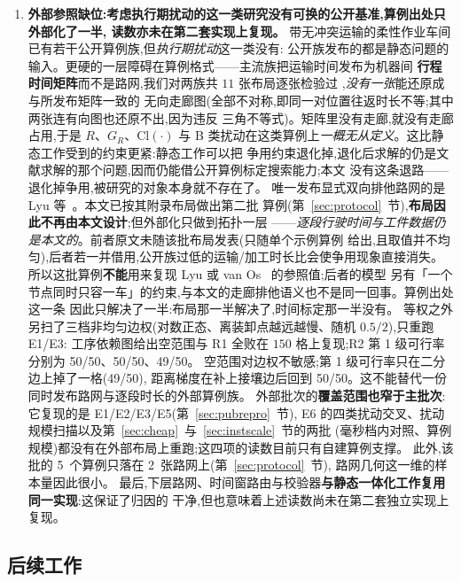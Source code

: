 \documentclass[manuscript,screen,review]{acmart}
\newcommand{\NPairs}{50}
\newcommand{\NPubInst}{5}
\newcommand{\NPubNets}{2}
\newcommand{\WeightLogRtwo}{\NPairs/\NPairs}
\newcommand{\WeightLuRtwo}{\NPairs/\NPairs}
\newcommand{\WeightSplitRtwo}{49/\NPairs}
\begin{document}
\begin{enumerate}[leftmargin=1.6em,itemsep=0.35em]
\item \textbf{外部参照缺位:考虑执行期扰动的这一类研究没有可换的公开基准,算例出处只外部化了一半,
读数亦未在第二套实现上复现。}
带无冲突运输的柔性作业车间已有若干公开算例族,但\emph{执行期扰动}这一类没有:
公开族发布的都是静态问题的输入。更硬的一层障碍在算例格式——主流族把运输时间发布为机器间
\textbf{行程时间矩阵}而不是路网,我们对两族共 \(11\) 张布局逐张检验过
\cite{homayouni2021production,bilge1995time},\emph{没有一张}能还原成与所发布矩阵一致的
无向走廊图(全部不对称,即同一对位置往返时长不等;其中两张连有向图也还原不出,因为违反
三角不等式)。矩阵里没有走廊,就没有走廊占用,于是 \(R\)、\(G_R\)、\(\mathrm{Cl}(\cdot)\)
与 B 类扰动在这类算例上\emph{一概无从定义}。这比静态工作受到的约束更紧:静态工作可以把
争用约束退化掉,退化后求解的仍是文献求解的那个问题,因而仍能借公开算例标定搜索能力;本文
没有这条退路——退化掉争用,被研究的对象本身就不存在了。
唯一发布显式双向排他路网的是 Lyu 等~\cite{lyu2019approach}。本文已按其附录布局做出第二批
算例(第~\ref{sec:protocol}~节),\textbf{布局因此不再由本文设计};但外部化只做到拓扑一层
——\emph{逐段行驶时间与工件数据仍是本文的}。前者原文未随该批布局发表(只随单个示例算例
给出,且取值并不均匀),后者若一并借用,公开族过低的运输/加工时长比会使争用现象直接消失。
所以这批算例\textbf{不能}用来复现 Lyu 或 van Os~\cite{vanos2026exact} 的参照值;后者的模型
另有「一个节点同时只容一车」的约束,与本文的走廊排他语义也不是同一回事。算例出处这一条
因此只解决了一半:布局那一半解决了,时间标定那一半没有。
等权之外另扫了三档非均匀边权(对数正态、离装卸点越远越慢、随机 \(0.5/2\)),只重跑 E1/E3:
工序依赖图给出空范围与 R1 全败在 \(150\) 格上复现;R2 第 1 级可行率分别为
\WeightLogRtwo、\WeightLuRtwo、\WeightSplitRtwo。
空范围对边权不敏感;第 1 级可行率只在二分边上掉了一格(\WeightSplitRtwo),
距离梯度在补上接壤边后回到 \WeightLuRtwo。这不能替代一份同时发布路网与逐段时长的外部算例族。
外部批次的\textbf{覆盖范围也窄于主批次}:它复现的是 E1/E2/E3/E5(第~\ref{sec:pubrepro}~节),
E6 的四类扰动交叉、扰动规模扫描以及第~\ref{sec:cheap}~与~\ref{sec:instscale}~节的两批
(毫秒档内对照、算例规模)都没有在外部布局上重跑;这四项的读数目前只有自建算例支撑。
此外,该批的 \NPubInst\ 个算例只落在 \NPubNets\ 张路网上(第~\ref{sec:protocol}~节),
路网几何这一维的样本量因此很小。
最后,下层路网、时间窗路由与校验器\textbf{与静态一体化工作复用同一实现}:这保证了归因的
干净,但也意味着上述读数尚未在第二套独立实现上复现。
\end{enumerate}

\subsection{后续工作}
\label{sec:future}
\end{document}
